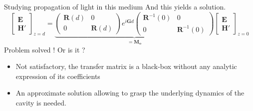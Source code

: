 \documentclass[aspectratio=169]{beamer}
\begin{document}
\begin{frame}{Studying propagation of light in this medium}
	And this yields a solution.
	\begin{equation*}
	\begin{bmatrix}
	\bm{E}\\\bm{H}'
	\end{bmatrix}_{z=d} = \underbrace{\begin{pmatrix}
		\bm{R}(d) & 0\\0 & \bm{R}(d)
		\end{pmatrix}e^{i\bm{G}d}\begin{pmatrix}
		\bm{R}^{-1}(0) & 0\\0 & \bm{R}^{-1}(0)
		\end{pmatrix}}_{=\bm{M_o}}\begin{bmatrix}
	\bm{E}\\\bm{H}'
	\end{bmatrix}_{z=0}
	\end{equation*}
	Problem solved !
	\alert{Or is it ?}
	\begin{itemize}
		\item Not satisfactory, the transfer matrix is a black-box without any analytic expression of its coefficients
		\item An approximate solution allowing to grasp the underlying dynamics of the cavity is needed.
	\end{itemize}
\end{frame}
\end{document}
